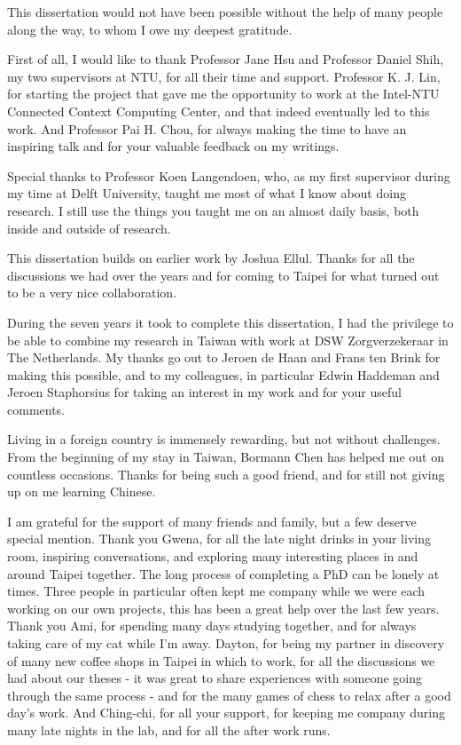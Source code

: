 \begin{acknowledgementsen}

This dissertation would not have been possible without the help of many people along the way, to whom I owe my deepest gratitude.

First of all, I would like to thank Professor Jane Hsu and Professor Daniel Shih, my two supervisors at NTU, for all their time and support. Professor K. J. Lin, for starting the project that gave me the opportunity to work at the Intel-NTU Connected Context Computing Center, and that indeed eventually led to this work. And Professor Pai H. Chou, for always making the time to have an inspiring talk and for your valuable feedback on my writings.

Special thanks to Professor Koen Langendoen, who, as my first supervisor during my time at Delft University, taught me most of what I know about doing research. I still use the things you taught me on an almost daily basis, both inside and outside of research. 

This dissertation builds on earlier work by Joshua Ellul. Thanks for all the discussions we had over the years and for coming to Taipei for what turned out to be a very nice collaboration.

During the seven years it took to complete this dissertation, I had the privilege to be able to combine my research in Taiwan with work at DSW Zorgverzekeraar in The Netherlands. My thanks go out to Jeroen de Haan and Frans ten Brink for making this possible, and to my colleagues, in particular Edwin Haddeman and Jeroen Staphorsius for taking an interest in my work and for your useful comments.

Living in a foreign country is immensely rewarding, but not without challenges. From the beginning of my stay in Taiwan, Bormann Chen has helped me out on countless occasions. Thanks for being such a good friend, and for still not giving up on me learning Chinese.

I am grateful for the support of many friends and family, but a few deserve special mention. Thank you Gwena, for all the late night drinks in your living room, inspiring conversations, and exploring many interesting places in and around Taipei together. The long process of completing a PhD can be lonely at times. Three people in particular often kept me company while we were each working on our own projects, this has been a great help over the last few years. Thank you Ami, for spending many days studying together, and for always taking care of my cat while I'm away. Dayton, for being my partner in discovery of many new coffee shops in Taipei in which to work, for all the discussions we had about our theses - it was great to share experiences with someone going through the same process - and for the many games of chess to relax after a good day's work. And Ching-chi, for all your support, for keeping me company during many late nights in the lab, and for all the after work runs.


\end{acknowledgementsen}
